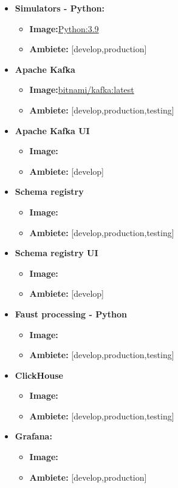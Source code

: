 \begin{itemize}
  \item \textbf{Simulators - Python:} 
  \begin{itemize}
    \item \textbf{Image:}\href{https://hub.docker.com/_/python}{Python:3.9}
    \item \textbf{Ambiete:} [develop,production]
  \end{itemize}
  \item \textbf{Apache Kafka} 
 \begin{itemize}
    \item \textbf{Image:}\href{https://hub.docker.com/layers/bitnami/kafka/latest/images/sha256-4894d89d28f8e06a7d8a064efdc2dc9cb61dd205721c61296b6d033ad4824a91?context=explore}{bitnami/kafka:latest}
    \item \textbf{Ambiete:} [develop,production,testing]
  \end{itemize}
  \item \textbf{Apache Kafka UI} 
 \begin{itemize}
    \item \textbf{Image:}
    \item \textbf{Ambiete:} [develop]
  \end{itemize}
  \item \textbf{Schema registry} 
 \begin{itemize}
    \item \textbf{Image:}
    \item \textbf{Ambiete:} [develop,production,testing]
  \end{itemize}
  \item \textbf{Schema registry UI} 
 \begin{itemize}
    \item \textbf{Image:}
    \item \textbf{Ambiete:} [develop]
  \end{itemize}
  \item \textbf{Faust processing - Python} 
 \begin{itemize}
    \item \textbf{Image:}
    \item \textbf{Ambiete:} [develop,production,testing]
  \end{itemize}
  \item \textbf{ClickHouse} 
  \begin{itemize}
    \item \textbf{Image:}
    \item \textbf{Ambiete:} [develop,production,testing]
  \end{itemize}
  \item \textbf{Grafana:} 
  \begin{itemize}
    \item \textbf{Image:}
    \item \textbf{Ambiete:} [develop,production]
  \end{itemize}
\end{itemize}


